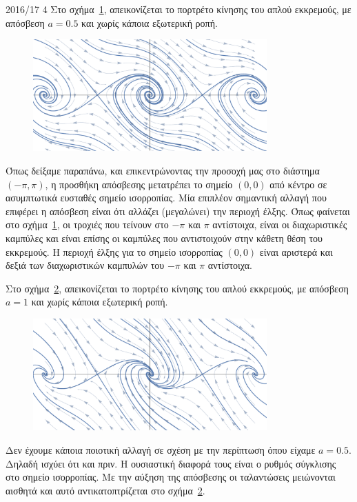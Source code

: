 \begin{solution}{2016/17 4}
    Στο σχήμα~\ref{fig:ex4_damped05Comb}, απεικονίζεται το πορτρέτο κίνησης
    του απλού εκκρεμούς, με απόσβεση \( a = 0.5 \) και χωρίς κάποια εξωτερική ροπή.
    \begin{figure}[h]
        \centering
        \includegraphics[width=0.8\textwidth]{figures/ex4_damped05Comb.pdf}
        \caption{}
        \label{fig:ex4_damped05Comb}
    \end{figure}
    Όπως δείξαμε παραπάνω, και επικεντρώνοντας την προσοχή μας στο διάστημα
    \( (-\pi,\pi) \), η προσθήκη απόσβεσης μετατρέπει το σημείο \( (0, 0) \) από
    κέντρο σε ασυμπτωτικά ευσταθές σημείο ισορροπίας. Μία επιπλέον σημαντική αλλαγή
    που επιφέρει η απόσβεση είναι ότι αλλάζει (μεγαλώνει) την περιοχή έλξης. Όπως
    φαίνεται στο σχήμα~\ref{fig:ex4_damped05Comb}, οι τροχιές που τείνουν στο
    \( -\pi \) και \( \pi \) αντίστοιχα, είναι οι διαχωριστικές καμπύλες και
    είναι επίσης οι καμπύλες που αντιστοιχούν στην κάθετη θέση του εκκρεμούς.
    Η περιοχή έλξης για το σημείο ισορροπίας \( (0, 0) \) είναι αριστερά και
    δεξιά των διαχωριστικών καμπυλών του \( -\pi \) και \( \pi \) αντίστοιχα.

    Στο σχήμα~\ref{fig:ex4_damped1Comb}, απεικονίζεται το πορτρέτο κίνησης
    του απλού εκκρεμούς, με απόσβεση \( a = 1 \) και χωρίς κάποια εξωτερική ροπή.
    \begin{figure}[h]
        \centering
        \includegraphics[width=0.8\textwidth]{figures/ex4_damped1Comb.pdf}
        \caption{}
        \label{fig:ex4_damped1Comb}
    \end{figure}
    Δεν έχουμε κάποια ποιοτική αλλαγή σε σχέση με την περίπτωση όπου είχαμε
    \( a = 0.5 \). Δηλαδή ισχύει ότι και πριν. Η ουσιαστική διαφορά τους είναι
    ο ρυθμός σύγκλισης στο σημείο ισορροπίας. Με την αύξηση της απόσβεσης οι
    ταλαντώσεις μειώνονται αισθητά και αυτό αντικατοπτρίζεται στο
    σχήμα~\ref{fig:ex4_damped1Comb}.


\end{solution}
